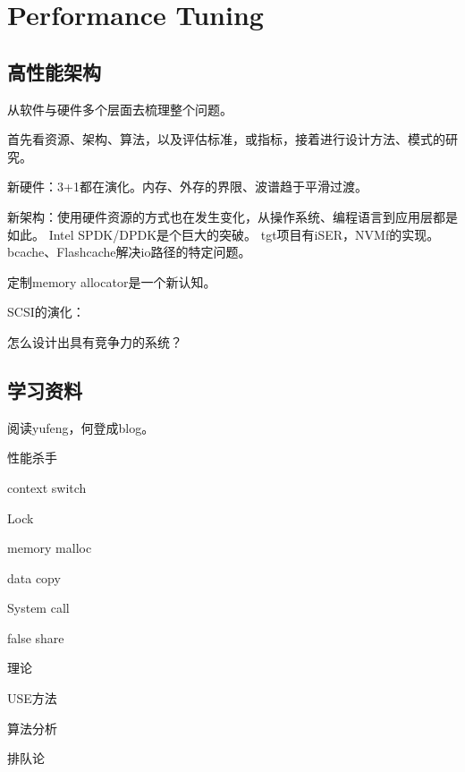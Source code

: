 \chapter{Performance Tuning}

\section{高性能架构}

从软件与硬件多个层面去梳理整个问题。

首先看资源、架构、算法，以及评估标准，或指标，接着进行设计方法、模式的研究。

新硬件：3+1都在演化。内存、外存的界限、波谱趋于平滑过渡。

新架构：使用硬件资源的方式也在发生变化，从操作系统、编程语言到应用层都是如此。
Intel SPDK/DPDK是个巨大的突破。
tgt项目有iSER，NVMf的实现。
bcache、Flashcache解决io路径的特定问题。

定制memory allocator是一个新认知。

SCSI的演化：

怎么设计出具有竞争力的系统？

\section{学习资料}

阅读yufeng，何登成blog。

性能杀手
\begin{enumbox}
\item context switch 
\item Lock 
\item memory malloc
\item data copy
\item System call 
\item false share
\end{enumbox}

理论
\begin{enumbox}
\item USE方法
\item 算法分析
\item 排队论
\end{enumbox}

